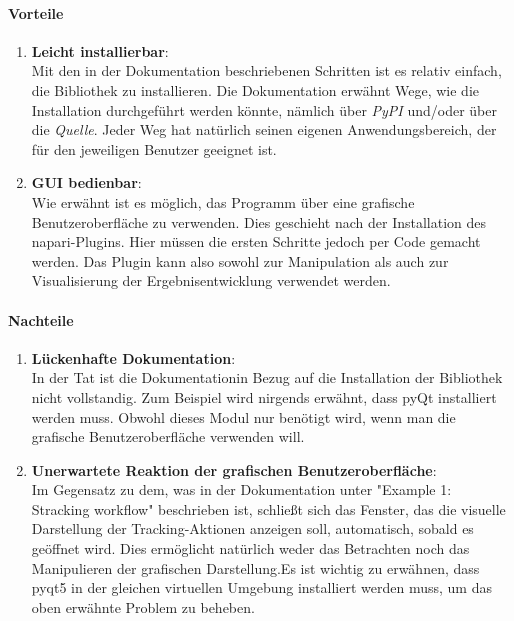 	\paragraph{Vorteile}
		\begin{enumerate}
    			\item \textbf{Leicht installierbar}:\\
				Mit den in der Dokumentation beschriebenen Schritten ist es relativ einfach, die Bibliothek zu installieren. Die Dokumentation erwähnt Wege, wie die Installation durchgeführt werden könnte, nämlich über \textit{PyPI} und/oder über die \textit{Quelle}. 
Jeder Weg hat natürlich seinen eigenen Anwendungsbereich, der für den jeweiligen Benutzer geeignet ist.

    			\item \textbf{GUI bedienbar}:\\
				Wie erwähnt ist es möglich, das Programm über eine grafische Benutzeroberfläche zu verwenden. Dies geschieht nach der Installation des napari-Plugins.
Hier müssen die ersten Schritte jedoch per Code gemacht werden. 
Das Plugin kann also sowohl zur Manipulation als auch zur Visualisierung der Ergebnisentwicklung verwendet werden. 

		\end{enumerate}
		
	\paragraph{Nachteile}
		\begin{enumerate}
    			\item \textbf{Lückenhafte Dokumentation}:\\
				In der Tat ist die Dokumentationin Bezug auf die Installation der Bibliothek nicht vollstandig. Zum Beispiel wird nirgends erwähnt, dass pyQt installiert werden muss.  Obwohl dieses Modul nur benötigt wird, wenn man die grafische Benutzeroberfläche verwenden will.
				
    			\item \textbf{Unerwartete Reaktion der grafischen Benutzeroberfläche}:\\
				Im Gegensatz zu dem, was in der Dokumentation unter "Example 1: Stracking workflow" beschrieben ist, schließt sich das Fenster, das die visuelle Darstellung der Tracking-Aktionen anzeigen soll, automatisch, sobald es geöffnet wird.  Dies ermöglicht natürlich weder das Betrachten noch das Manipulieren der grafischen Darstellung.Es ist wichtig zu erwähnen, dass pyqt5 in der gleichen virtuellen Umgebung installiert werden muss, um das oben erwähnte Problem zu beheben.
    			
		\end{enumerate}
		

